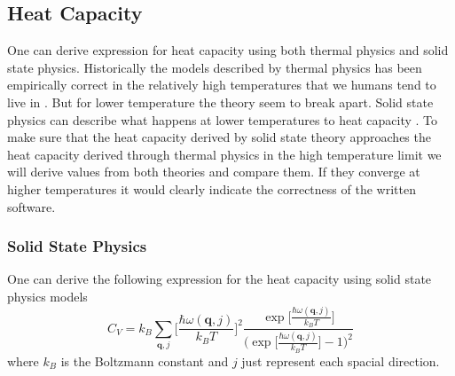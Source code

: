 \documentclass[11pt]{article}
\begin{document}
\subsection{Heat Capacity}
One can derive expression for heat capacity using both thermal physics and solid state physics. Historically the models described by thermal physics has been empirically correct in the relatively high temperatures that we humans tend to live in \cite{bib:thermo}. But for lower temperature the theory seem to break apart. Solid state physics can describe what happens at lower temperatures to heat capacity \cite{bib:solid}. To make sure that the heat capacity derived by solid state theory approaches the heat capacity derived through thermal physics in the high temperature limit we will derive values from both theories and compare them. If they converge at higher temperatures it  would clearly indicate the correctness of the written software.
\subsubsection{Solid State Physics}
One can derive the following expression for the heat capacity using solid state physics models\cite{bib:solid}
\begin{equation}
	C_V = k_B \sum_{\mathbf{q}, j} \Big[\frac{\hbar \omega(\mathbf{q},j)}{k_B T}\Big]^2
	\frac{\exp{\Big[\frac{\hbar \omega(\mathbf{q},j)}{k_B T}\Big]}}{\Big(\exp{\Big[\frac{\hbar \omega(\mathbf{q},j)}{k_B T}\Big]}-1\Big)^2}
	\label{eq:CV}
\end{equation}
where $k_B$ is the Boltzmann constant and $j$ just represent each spacial direction. 
\end{document}
